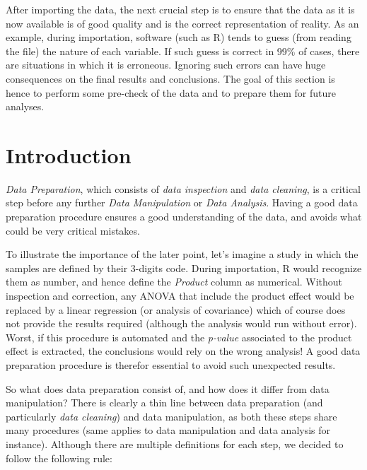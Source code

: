 \documentclass[
]{krantz}
\renewenvironment{quote}{\begin{VF}}{\end{VF}}
\begin{document}
\begin{quote}
After importing the data, the next crucial step is to ensure that the data as it is now available is of good quality and is the correct representation of reality. As an example, during importation, software (such as R) tends to guess (from reading the file) the nature of each variable. If such guess is correct in 99\% of cases, there are situations in which it is erroneous. Ignoring such errors can have huge consequences on the final results and conclusions. The goal of this section is hence to perform some pre-check of the data and to prepare them for future analyses.
\end{quote}

\hypertarget{introduction-1}{%
\section{Introduction}\label{introduction-1}}

\emph{Data Preparation}, which consists of \emph{data inspection} and \emph{data cleaning}, is a critical step before any further \emph{Data Manipulation} or \emph{Data Analysis}. Having a good data preparation procedure ensures a good understanding of the data, and avoids what could be very critical mistakes.

To illustrate the importance of the later point, let's imagine a study in which the samples are defined by their 3-digits code.
During importation, R would recognize them as number, and hence define the \emph{Product} column as numerical. Without inspection and correction, any ANOVA that include the product effect would be replaced by a linear regression (or analysis of covariance) which of course does not provide the results required (although the analysis would run without error). Worst, if this procedure is automated and the \emph{p-value} associated to the product effect is extracted, the conclusions would rely on the wrong analysis! A good data preparation procedure is therefor essential to avoid such unexpected results.

So what does data preparation consist of, and how does it differ from data manipulation?
There is clearly a thin line between data preparation (and particularly \emph{data cleaning}) and data manipulation, as both these steps share many procedures (same applies to data manipulation and data analysis for instance). Although there are multiple definitions for each step, we decided to follow the following rule:
\end{document}
